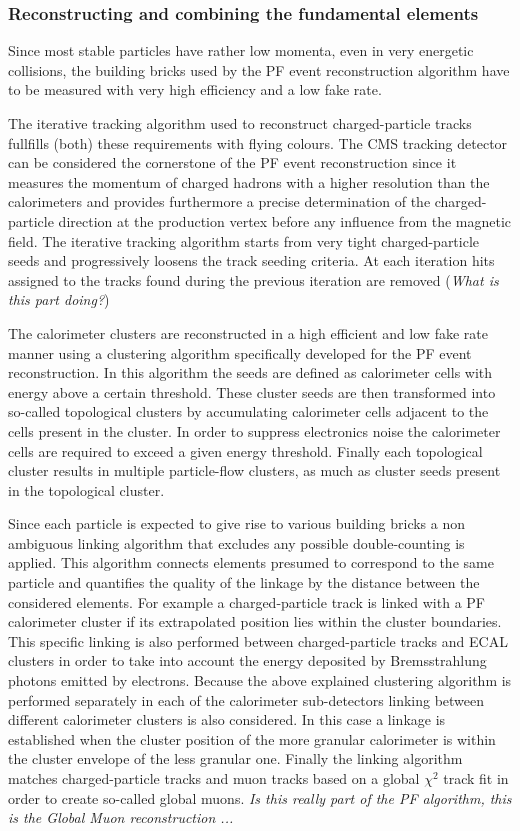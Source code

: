 \subsubsection*{Reconstructing and combining the fundamental elements}

Since most stable particles have rather low momenta, even in very energetic collisions, the building bricks used by the PF event reconstruction algorithm have to be measured with very high efficiency and a low fake rate. 

The iterative tracking algorithm used to reconstruct charged-particle tracks fullfills (both) these requirements with flying colours. The CMS tracking detector can be considered the cornerstone of the PF event reconstruction since it measures the momentum of charged hadrons with a higher resolution than the calorimeters and provides furthermore a precise determination of the charged-particle direction at the production vertex before any influence from the magnetic field. The iterative tracking algorithm starts from very tight charged-particle seeds and progressively loosens the track seeding criteria. At each iteration hits assigned to the tracks found during the previous iteration are removed (\textit{What is this part doing?})

The calorimeter clusters are reconstructed in a high efficient and low fake rate manner using a clustering algorithm specifically developed for the PF event reconstruction. In this algorithm the seeds are defined as calorimeter cells with energy above a certain threshold. These cluster seeds are then transformed into so-called topological clusters by accumulating calorimeter cells adjacent to the cells present in the cluster. In order to suppress electronics noise the calorimeter cells are required to exceed a given energy threshold. Finally each topological cluster results in multiple particle-flow clusters, as much as cluster seeds present in the topological cluster.

Since each particle is expected to give rise to various building bricks a non ambiguous linking algorithm that excludes any possible double-counting is applied. This algorithm connects elements presumed to correspond to the same particle and quantifies the quality of the linkage by the distance between the considered elements. For example a charged-particle track is linked with a PF calorimeter cluster if its extrapolated position lies within the cluster boundaries. This specific linking is also performed between charged-particle tracks and ECAL clusters in order to take into account the energy deposited by Bremsstrahlung photons emitted by electrons. Because the above explained clustering algorithm is performed separately in each of the calorimeter sub-detectors linking between different calorimeter clusters is also considered. In this case a linkage is established when the cluster position of the more granular calorimeter is within the cluster envelope of the less granular one. Finally the linking algorithm matches charged-particle tracks and muon tracks based on a global $\chi^{2}$ track fit in order to create so-called global muons. \textit{Is this really part of the PF algorithm, this is the Global Muon reconstruction ...}

